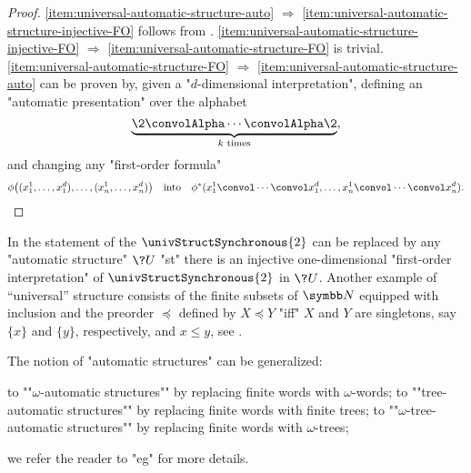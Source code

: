 \begin{proof}
	\eqref{item:universal-automatic-structure-auto} $\Rightarrow$
	\eqref{item:universal-automatic-structure-injective-FO} follows from
	.
	\eqref{item:universal-automatic-structure-injective-FO} $\Rightarrow$
	\eqref{item:universal-automatic-structure-FO} is trivial.
	\eqref{item:universal-automatic-structure-FO} $\Rightarrow$
	\eqref{item:universal-automatic-structure-auto} can be proven by,
	given a "$d$-dimensional interpretation", defining an "automatic presentation"
	over the alphabet
	\[
		\underbrace{\2 \convolAlpha \cdots \convolAlpha \2}_{
			\text{$k$ times}
		},
	\]
	and changing any "first-order formula"
	\[
		\phi\big((x_1^1, \hdots, x_1^d), \hdots, (x_n^1, \hdots, x_n^d)\big)
		\quad\text{into}\quad
		\phi^*(x_1^1 \convol \cdots \convol x_1^d, \hdots, x_n^1 \convol \cdots \convol x_n^d).\qedhere
	\]
\end{proof}

In the statement of \label{prop:universal-automatic-structure} the
$\univStructSynchronous{2}$ can be replaced by any "automatic structure" $\?U$
"st" there is an injective one-dimensional "first-order interpretation" of
$\univStructSynchronous{2}$ in $\?U$. 
Another example of ``universal'' structure consists of the finite subsets of $\N$ equipped
with inclusion and the preorder $\preceq$ defined by $X \preceq Y$ "iff" $X$ and $Y$ are 
singletons, say $\{x\}$ and $\{y\}$, respectively, and $x \leq y$,
see \cite[Theorem~XII.2.3]{Blumensath2024MSOModelTheory}.

The notion of "automatic structures" can be generalized:
\begin{itemize}
	\itemAP to ""$\omega$-automatic structures"" by replacing finite words with $\omega$-words;
	\itemAP to ""tree-automatic structures"" by replacing finite words with finite trees;
	\itemAP to ""$\omega$-tree-automatic structures"" by replacing finite words with $\omega$-trees;
\end{itemize}
we refer the reader to "eg" \cite[\S~XII]{Blumensath2024MSOModelTheory} for more details.


